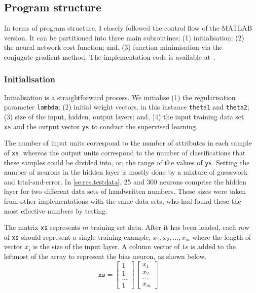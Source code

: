 \subsection{Program structure} \label{se:impl.program.struct}

In terms of program structure, I closely followed the control flow of the MATLAB version. It can be partitioned into three main subroutines: (1) initialisation; (2) the neural network cost function; and, (3) function minimisation via the conjugate gradient method. The implementation code is available at~\cite{McDJeo}.

\subsubsection{Initialisation} \label{se:impl.init}

Initialisation is a straightforward process. We initialise (1) the regularisation parameter \texttt{lambda}; (2) initial weight vectors, in this instance \texttt{theta1} and \texttt{theta2}; (3) size of the input, hidden, output layers; and, (4) the input training data set \texttt{xs} and the output vector \texttt{ys} to conduct the supervised learning. 

The number of input units correspond to the number of attributes in each sample of \texttt{xs}, whereas the output units correspond to the number of classifications that these samples could be divided into, or, the range of the values of \texttt{ys}. Setting the number of neurons in the hidden layer is mostly done by a mixture of guesswork and trial-and-error. In \ref{se:res.testdata}, 25 and 300 neurons comprise the hidden layer for two different data sets of handwritten numbers. These sizes were taken from other implementations with the same data sets, who had found these the most effective numbers by testing.

The matrix \texttt{xs} represents $m$ training set data. After it has been loaded, each row of \texttt{xs} should represent a single training example, $x_1, x_2, ..., x_m$ where the length of vector $x_i$ is the size of the input layer. A column vector of $1$s is added to the leftmost of the array to represent the bias neuron, as shown below.
\[
 \texttt{xs} =
    \begin{bmatrix}
      1 \\
      1 \\
      ... \\ 
      1
    \end{bmatrix}
    \begin{bmatrix}
       x_1 \\
       x_2 \\
       ... \\
       x_m
    \end{bmatrix}
\]


